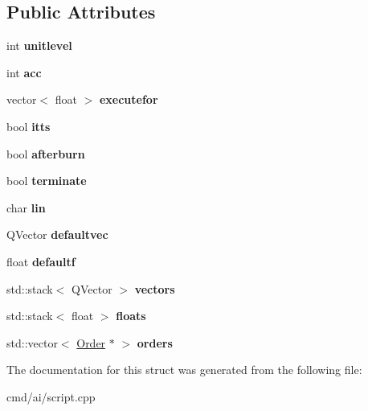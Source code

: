 \subsection*{Public Attributes}
\begin{DoxyCompactItemize}
\item 
int {\bfseries unitlevel}\hypertarget{structAIScriptXML_ad33711ddea17d075e0478325f301015b}{}\label{structAIScriptXML_ad33711ddea17d075e0478325f301015b}

\item 
int {\bfseries acc}\hypertarget{structAIScriptXML_a913e263c98b4d8f927862d7dcd04914f}{}\label{structAIScriptXML_a913e263c98b4d8f927862d7dcd04914f}

\item 
vector$<$ float $>$ {\bfseries executefor}\hypertarget{structAIScriptXML_a514dc049e58d78ad22a7e02357eba233}{}\label{structAIScriptXML_a514dc049e58d78ad22a7e02357eba233}

\item 
bool {\bfseries itts}\hypertarget{structAIScriptXML_aa57fc65c14f42095b420d3c25c11a0a7}{}\label{structAIScriptXML_aa57fc65c14f42095b420d3c25c11a0a7}

\item 
bool {\bfseries afterburn}\hypertarget{structAIScriptXML_aab5807d31f9ef50afa78b2d4c25433ea}{}\label{structAIScriptXML_aab5807d31f9ef50afa78b2d4c25433ea}

\item 
bool {\bfseries terminate}\hypertarget{structAIScriptXML_a0e9499ebbafb7bbce2419cf7325bbd26}{}\label{structAIScriptXML_a0e9499ebbafb7bbce2419cf7325bbd26}

\item 
char {\bfseries lin}\hypertarget{structAIScriptXML_ada0b71cd3ee30cfc0ba8b3a4a2ce4701}{}\label{structAIScriptXML_ada0b71cd3ee30cfc0ba8b3a4a2ce4701}

\item 
Q\+Vector {\bfseries defaultvec}\hypertarget{structAIScriptXML_a2f570876b52079dc5fbccc947af09744}{}\label{structAIScriptXML_a2f570876b52079dc5fbccc947af09744}

\item 
float {\bfseries defaultf}\hypertarget{structAIScriptXML_a8fcae40cf80fd70fadd9bbb25baacb03}{}\label{structAIScriptXML_a8fcae40cf80fd70fadd9bbb25baacb03}

\item 
std\+::stack$<$ Q\+Vector $>$ {\bfseries vectors}\hypertarget{structAIScriptXML_afcbf2ba6227deed892ff101822cc5b96}{}\label{structAIScriptXML_afcbf2ba6227deed892ff101822cc5b96}

\item 
std\+::stack$<$ float $>$ {\bfseries floats}\hypertarget{structAIScriptXML_a0c6797825d1b9d7dc64be73cc2aa9770}{}\label{structAIScriptXML_a0c6797825d1b9d7dc64be73cc2aa9770}

\item 
std\+::vector$<$ \hyperlink{classOrder}{Order} $\ast$ $>$ {\bfseries orders}\hypertarget{structAIScriptXML_a7b2c4fb3d455c27f0c4877c1c993df00}{}\label{structAIScriptXML_a7b2c4fb3d455c27f0c4877c1c993df00}

\end{DoxyCompactItemize}


The documentation for this struct was generated from the following file\+:\begin{DoxyCompactItemize}
\item 
cmd/ai/script.\+cpp\end{DoxyCompactItemize}
